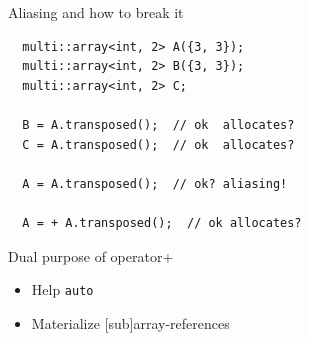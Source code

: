 \documentclass[t,aspectratio=169,handout]{beamer}
\begin{document}
\begin{frame}[fragile]{Aliasing and how to break it}
\begin{lstlisting}
  multi::array<int, 2> A({3, 3});
  multi::array<int, 2> B({3, 3});
  multi::array<int, 2> C;

  B = A.transposed();  // ok  allocates?
  C = A.transposed();  // ok  allocates?

  A = A.transposed();  // ok? aliasing!

  A = + A.transposed();  // ok allocates?
\end{lstlisting}

\begin{alertblock}{Dual purpose of operator+}
  \begin{itemize}
    \item Help \texttt{auto}
    \item Materialize [sub]array-references
  \end{itemize}
\end{alertblock}
\end{frame}
\end{document}
